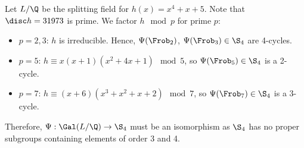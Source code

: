 \begin{ex}
Let $L/\Q$ be the splitting field for $h(x)= x^4+x+5$. Note that $\disc h= 31973$ is prime. We factor $h \mod p$ for prime $p$:
\begin{itemize}
\item $p=2,3$: $h$ is irreducible. Hence, $\Psi(\Frob_2)$, $\Psi(\Frob_3) \in \S_4$ are 4-cycles.
\item $p=5$: $h \equiv x(x+1)(x^2+4x+1) \mod 5$, so $\Psi(\Frob_5) \in \S_4$ is a 2-cycle.
\item $p=7$: $h \equiv (x+6)(x^3+x^2+x+2) \mod 7$, so $\Psi(\Frob_7) \in \S_4$ is a 3-cycle.
\end{itemize}
Therefore, $\Psi: \Gal(L/\Q) \to \S_4$ must be an isomorphism as $\S_4$ has no proper subgroups containing elements of order 3 and 4. \xqed 
\end{ex}


